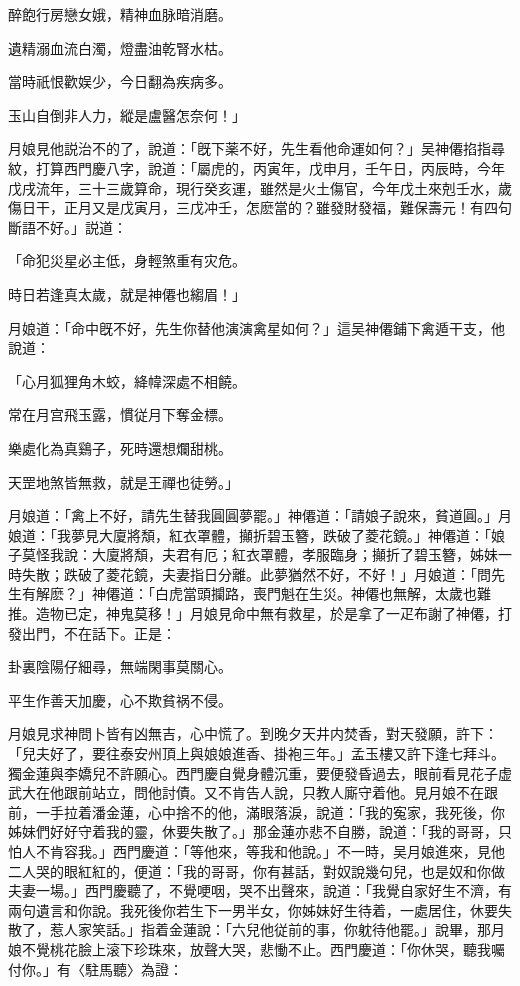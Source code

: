 醉飽行房戀女娥，精神血脉暗消磨。

遺精溺血流白濁，燈盡油乾腎水枯。

當時祇恨歡娱少，今日翻為疾病多。

玉山自倒非人力，縱是盧醫怎奈何！」

月娘見他説治不的了，說道：「旣下薬不好，先生看他命運如何？」吴神僊掐指尋紋，打算西門慶八字，說道：「屬虎的，丙寅年，戊申月，壬午日，丙辰時，今年戊戌流年，三十三歲算命，現行癸亥運，雖然是火土傷官，今年戊土來剋壬水，歲傷日干，正月又是戊寅月，三戊冲壬，怎麽當的？雖發財發福，難保壽元！有四句斷語不好。」説道：

「命犯災星必主低，身輕煞重有灾危。

時日若逢真太歲，就是神僊也縐眉！」

月娘道：「命中旣不好，先生你替他演演禽星如何？」這吴神僊鋪下禽遁干支，他說道：

「心月狐狸角木蛟，絳幃深處不相饒。

常在月宫飛玉露，慣従月下奪金標。

樂處化為真鷄子，死時還想爛甜桃。

天罡地煞皆無救，就是王禪也徒勞。」

月娘道：「禽上不好，請先生替我圓圓夢罷。」神僊道：「請娘子說來，貧道圓。」月娘道：「我夢見大廈將頽，紅衣罩體，攧折碧玉簪，跌破了菱花鏡。」神僊道：「娘子莫怪我說：大廈將頽，夫君有厄；紅衣罩體，孝服臨身；攧折了碧玉簪，姊妹一時失散；跌破了菱花鏡，夫妻指日分離。此夢猶然不好，不好！」月娘道：「問先生有解麽？」神僊道：「白虎當頭攔路，喪門魁在生災。神僊也無解，太歲也難推。造物已定，神鬼莫移！」月娘見命中無有救星，於是拿了一疋布謝了神僊，打發出門，不在話下。正是：

卦裏陰陽仔細尋，無端閑事莫關心。

平生作善天加慶，心不欺貧祸不侵。

月娘見求神問卜皆有凶無吉，心中慌了。到晚夕天井内焚香，對天發願，許下：「兒夫好了，要往泰安州頂上與娘娘進香、掛袍三年。」孟玉樓又許下逢七拜斗。獨金蓮與李嬌兒不許願心。西門慶自覺身體沉重，要便發昏過去，眼前看見花子虚武大在他跟前站立，問他討債。又不肯告人說，只教人廝守着他。見月娘不在跟前，一手拉着潘金蓮，心中捨不的他，滿眼落淚，說道：「我的寃家，我死後，你姊妹們好好守着我的靈，休要失散了。」那金蓮亦悲不自勝，說道：「我的哥哥，只怕人不肯容我。」西門慶道：「等他來，等我和他說。」不一時，吴月娘進來，見他二人哭的眼紅紅的，便道：「我的哥哥，你有甚話，對奴說幾句兒，也是奴和你做夫妻一場。」西門慶聽了，不覺哽咽，哭不出聲來，說道：「我覺自家好生不濟，有兩句遺言和你說。我死後你若生下一男半女，你姊妹好生待着，一處居住，休要失散了，惹人家笑話。」指着金蓮說：「六兒他従前的事，你躭待他罷。」說畢，那月娘不覺桃花臉上滚下珍珠來，放聲大哭，悲慟不止。西門慶道：「你休哭，聽我囑付你。」有〈駐馬聽〉為證：

